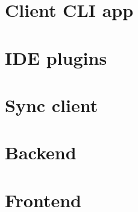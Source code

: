 
\section{Client CLI app}\label{sec:cli-app}

\section{IDE plugins}\label{sec:ide-plugins}

\section{Sync client}\label{sec:sync-client}

\section{Backend}\label{sec:backend}

\section{Frontend}\label{sec:frontend}

